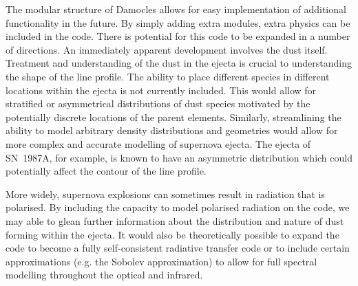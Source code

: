 The modular structure of Damocles allows for easy implementation of additional functionality in the future.  By simply adding extra modules, extra physics can be included in the code.  There is potential for this code to be expanded in a number of directions.  An immediately apparent development involves the dust itself.  Treatment and understanding of the dust in the ejecta is crucial to understanding the shape of the line profile.  The ability to place different species in different locations within the ejecta is not currently included.  This would allow for stratified or asymmetrical distributions of dust species motivated by the potentially discrete locations of the parent elements.  Similarly, streamlining the ability to model arbitrary density distributions and geometries would allow for more complex and accurate modelling of supernova ejecta.  The ejecta of SN~1987A, for example, is known to have an asymmetric distribution which could potentially affect the contour of the line profile.

More widely, supernova explosions can sometimes result in radiation that is polarised.  By including the capacity to model polarised radiation on the code, we may able to glean further information about the distribution and nature of dust forming within the ejecta.  It would also be theoretically possible to expand the code to become a fully self-consistent radiative transfer code or to include certain approximations (e.g. the Sobolev approximation) to allow for full spectral modelling throughout the optical and infrared.

\label{limitations}
		



